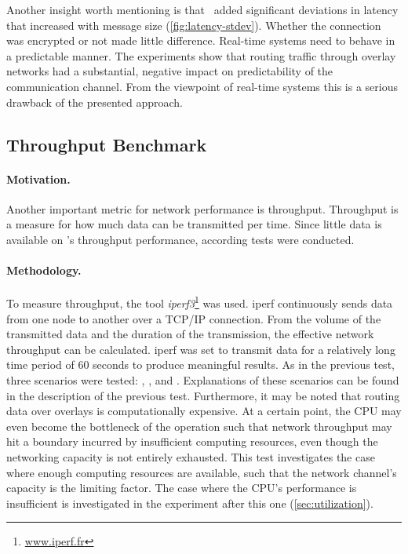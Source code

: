 Another insight worth mentioning is that \wnet\ added significant deviations in latency that increased with message size (\cf \autoref{fig:latency-stdev}). Whether the connection was encrypted or not made little difference. Real-time systems need to behave in a predictable manner. The experiments show that routing traffic through overlay networks had a substantial, negative impact on predictability of the communication channel. From the viewpoint of real-time systems this is a serious drawback of the presented approach. 



%
%
%
%
%
%
%
%
%
%

\subsection{Throughput Benchmark} \label{sec:throughput}

\paragraph{Motivation.} Another important metric for network performance is throughput. Throughput is a measure for how much data can be transmitted per time. Since little data is available on \wnet 's throughput performance, according tests were conducted.

\paragraph{Methodology.} To measure throughput, the tool \emph{iperf3}\footnote{\url{www.iperf.fr}} was used. iperf continuously sends data from one node to another over a TCP/IP connection. From the volume of the transmitted data and the duration of the transmission, the effective network throughput can be calculated. iperf was set to transmit data for a relatively long time period of 60 seconds to produce meaningful results. As in the previous test, three scenarios were tested:  , , and . Explanations of these scenarios can be found in the description of the previous test. Furthermore, it may be noted that routing data over overlays is computationally expensive. At a certain point, the CPU may even become the bottleneck of the operation such that network throughput may hit a boundary incurred by insufficient computing resources, even though the networking capacity is not entirely exhausted. This test investigates the case where enough computing resources are available, such that the network channel's capacity is the limiting factor. The case where the CPU's performance is insufficient is investigated in the experiment after this one (\ref{sec:utilization}).

